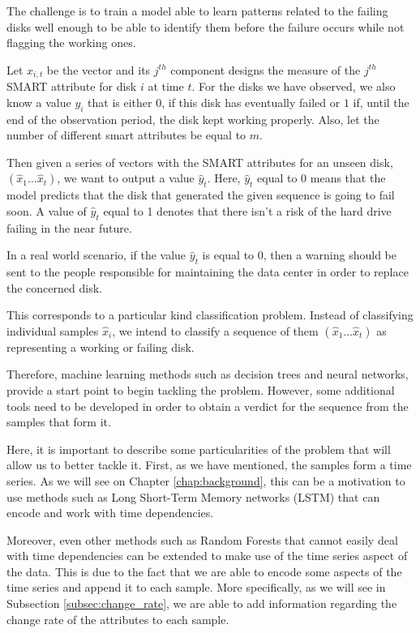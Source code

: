 The challenge is to train a model able to learn patterns related to the failing disks well enough to be able to identify them before the failure occurs while not flagging the working ones.

Let $x_{i,t}$ be the vector and its $j^{th}$ component designs the measure of the $j^{th}$ SMART attribute for disk $i$ at time $t$.
For the disks we have observed, we also know a value $y_i$ that is either $0$, if this disk has eventually failed or $1$ if, until the end of the observation period, the disk kept working properly.
Also, let the number of different smart attributes be equal to $m$.

Then given a series of vectors with the SMART attributes for an unseen disk, $\left(\hat{x}_1\dots\hat{x}_t\right)$, we want to output a value $\hat{y}_t$.
Here, $\hat{y}_t$ equal to 0 means that the model predicts that the disk that generated the given sequence is going to fail soon.
A value of $\hat{y}_t$ equal to 1 denotes that there isn't a risk of the hard drive failing in the near future.

In a real world scenario, if the value $\hat{y}_t$ is equal to $0$, then a warning should be sent to the people responsible for maintaining the data center in order to replace the concerned disk.

This corresponds to a particular kind classification problem.
Instead of classifying individual samples $\hat{x}_i$, we intend to classify a sequence of them $\left(\hat{x}_1\dots\hat{x}_t\right)$ as representing a working or failing disk.

Therefore, machine learning methods such as decision trees and neural networks, provide a start point to begin tackling the problem.
However, some additional tools need to be developed in order to obtain a verdict for the sequence from the samples that form it.

Here, it is important to describe some particularities of the problem that will allow us to better tackle it.
First, as we have mentioned, the samples form a time series.
As we will see on Chapter \ref{chap:background}, this can be a motivation to use methods such as Long Short-Term Memory networks (LSTM) that can encode and work with time dependencies.

Moreover, even other methods such as Random Forests that cannot easily deal with time dependencies can be extended to make use of the time series aspect of the data.
This is due to the fact that we are able to encode some aspects of the time series and append it to each sample.
More specifically, as we will see in Subsection \ref{subsec:change_rate}, we are able to add information regarding the change rate of the attributes to each sample.

